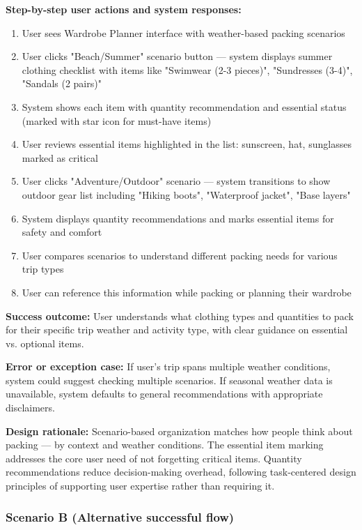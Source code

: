 \documentclass[11pt,a4paper]{article}
\begin{document}
\textbf{Step-by-step user actions and system responses:}
\begin{enumerate}
\item User sees Wardrobe Planner interface with weather-based packing scenarios
\item User clicks "Beach/Summer" scenario button — system displays summer clothing checklist with items like "Swimwear (2-3 pieces)", "Sundresses (3-4)", "Sandals (2 pairs)"
\item System shows each item with quantity recommendation and essential status (marked with star icon for must-have items)
\item User reviews essential items highlighted in the list: sunscreen, hat, sunglasses marked as critical
\item User clicks "Adventure/Outdoor" scenario — system transitions to show outdoor gear list including "Hiking boots", "Waterproof jacket", "Base layers"
\item System displays quantity recommendations and marks essential items for safety and comfort
\item User compares scenarios to understand different packing needs for various trip types
\item User can reference this information while packing or planning their wardrobe
\end{enumerate}

\textbf{Success outcome:} User understands what clothing types and quantities to pack for their specific trip weather and activity type, with clear guidance on essential vs. optional items.

\textbf{Error or exception case:} If user's trip spans multiple weather conditions, system could suggest checking multiple scenarios. If seasonal weather data is unavailable, system defaults to general recommendations with appropriate disclaimers.

\textbf{Design rationale:} Scenario-based organization matches how people think about packing — by context and weather conditions. The essential item marking addresses the core user need of not forgetting critical items. Quantity recommendations reduce decision-making overhead, following task-centered design principles of supporting user expertise rather than requiring it.

\subsubsection*{Scenario B (Alternative successful flow)}
\end{document}
